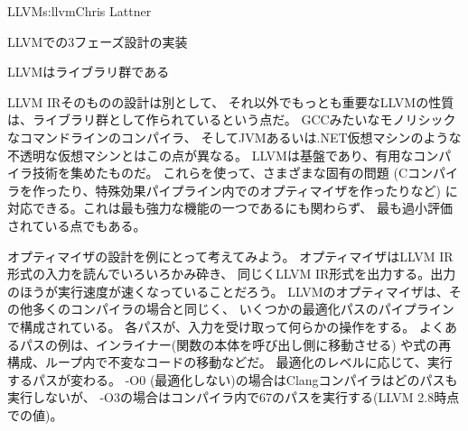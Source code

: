 \begin{aosachapter}{LLVM}{s:llvm}{Chris Lattner}
\begin{aosasect1}{LLVMでの3フェーズ設計の実装}
\begin{aosasect2}{LLVMはライブラリ群である}

LLVM IRそのものの設計は別として、
それ以外でもっとも重要なLLVMの性質は、ライブラリ群として作られているという点だ。
GCCみたいなモノリシックなコマンドラインのコンパイラ、
そしてJVMあるいは.NET仮想マシンのような不透明な仮想マシンとはこの点が異なる。
LLVMは基盤であり、有用なコンパイラ技術を集めたものだ。
これらを使って、さまざまな固有の問題
(Cコンパイラを作ったり、特殊効果パイプライン内でのオプティマイザを作ったりなど)
に対応できる。これは最も強力な機能の一つであるにも関わらず、
最も過小評価されている点でもある。

オプティマイザの設計を例にとって考えてみよう。
オプティマイザはLLVM IR形式の入力を読んでいろいろかみ砕き、
同じくLLVM IR形式を出力する。出力のほうが実行速度が速くなっていることだろう。
LLVMのオプティマイザは、その他多くのコンパイラの場合と同じく、
いくつかの最適化パスのパイプラインで構成されている。
各パスが、入力を受け取って何らかの操作をする。
よくあるパスの例は、インライナー(関数の本体を呼び出し側に移動させる)
や式の再構成、ループ内で不変なコードの移動などだ。
最適化のレベルに応じて、実行するパスが変わる。
-O0 (最適化しない)の場合はClangコンパイラはどのパスも実行しないが、
-O3の場合はコンパイラ内で67のパスを実行する(LLVM 2.8時点での値)。


\end{aosasect2}
\end{aosasect1}
\end{aosachapter}
